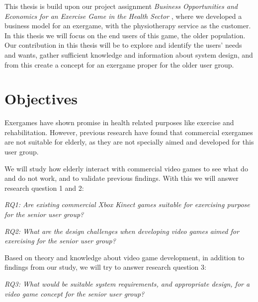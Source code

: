 This thesis is build upon our project assignment \emph{Business Opportunities and Economics for an Exercise Game in the Health Sector} \cite{project}, where we developed a business model for an exergame, with the physiotherapy service as the customer. In this thesis we will focus on the end users of this game, the older population. Our contribution in this thesis will be to explore and identify the users' needs and wants, gather sufficient knowledge and information about system design, and from this create a concept for an exergame proper for the older user group.

\section{Objectives}
\label{sec:researchq} Exergames have shown promise in health related purposes like exercise and rehabilitation. However, previous research have found that commercial exergames are not suitable for elderly, as they are not specially aimed and developed for this user group. 

We will study how elderly interact with commercial video games to see what do and do not work, and to validate previous findings. With this we will answer research question 1 and 2: 

\emph{RQ1: Are existing commercial Xbox Kinect games suitable for exercising purpose for the senior user group?} 

\emph{RQ2: What are the design challenges when developing video games aimed for exercising for the senior user group?}

Based on theory and knowledge about video game development, in addition to findings from our study, we will try to answer research question 3:

\emph{RQ3: What would be suitable system requirements, and appropriate design, for a video game concept for the senior user group?}


